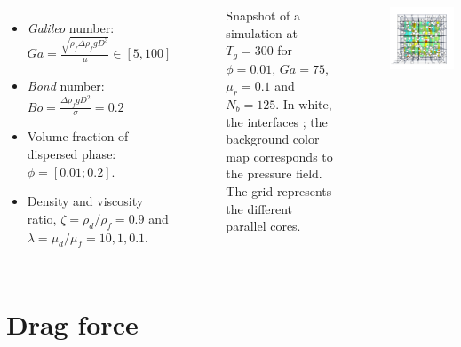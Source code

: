 \documentclass{sintefbeamer}
\begin{document}
\begin{frame}
\begin{columns}
{  \begin{itemize}
    \item \textit{Galileo} number: $Ga =\frac{\sqrt{\rho_f \Delta\rho_f gD^3}}{\mu} \in [5, 100]$
    \item \textit{Bond} number: $Bo = \frac{\Delta \rho_f g D^2}{\sigma} = 0.2$ 
    \item Volume fraction of dispersed phase: $\phi = [0.01;0.2]$. 
    \item Density and viscosity ratio, $\zeta=\rho_d/\rho_f=0.9$ and $\lambda=\mu_d/\mu_f= 10,1,0.1$. 
  \end{itemize}
  }
  \begin{figure}
    \caption{Snapshot of a simulation at $T_g = 300$ for $\phi = 0.01$, $Ga = 75$, $\mu_r = 0.1$ and $N_b = 125$. In white, the interfaces ; the background color map corresponds to the pressure field. The grid represents the different parallel cores.
    }
  \end{figure}
  \centering
  \href{videos/DNS.mp4}{}
  \includegraphics[width =  1.1\textwidth]{image/PHI_01_Ga_75.png}
  \end{columns}
\end{frame}

\section{Drag force}
\end{document}
